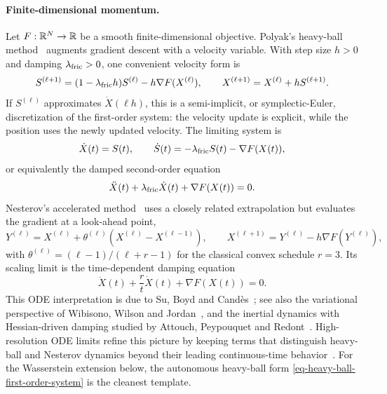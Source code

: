 \paragraph{Finite-dimensional momentum.}
Let $F:\mathbb{R}^{N}\to\mathbb{R}$ be a smooth finite-dimensional objective. Polyak's heavy-ball method~\cite{Polyak1964HeavyBall} augments gradient descent with a velocity variable. With step size $h>0$ and damping $\lambda_{\rm fric}>0$, one convenient velocity form is
\begin{equation}\label{eq-polyak-momentum}
	S^{(\ell+1)}=(1-\lambda_{\rm fric} h)S^{(\ell)}-h\nabla F(X^{(\ell)}),
	\qquad
	X^{(\ell+1)}=X^{(\ell)}+hS^{(\ell+1)}.
\end{equation}
If $S^{(\ell)}$ approximates $\dot X(\ell h)$, this is a semi-implicit, or symplectic-Euler, discretization of the first-order system: the velocity update is explicit, while the position uses the newly updated velocity. The limiting system is
\begin{equation}\label{eq-heavy-ball-first-order-system}
	\dot X(t)=S(t),
	\qquad
	\dot S(t)=-\lambda_{\rm fric} S(t)-\nabla F(X(t)),
\end{equation}
or equivalently the damped second-order equation
\begin{equation}\label{eq-heavy-ball-ode}
	\ddot X(t)+\lambda_{\rm fric}\dot X(t)+\nabla F(X(t))=0.
\end{equation}
Nesterov's accelerated method~\cite{Nesterov1983Accelerated} uses a closely related extrapolation but evaluates the gradient at a look-ahead point,
\begin{equation}\label{eq-nesterov-momentum}
	Y^{(\ell)}=X^{(\ell)}+\theta^{(\ell)}(X^{(\ell)}-X^{(\ell-1)}),
	\qquad
	X^{(\ell+1)}=Y^{(\ell)}-h\nabla F(Y^{(\ell)}),
\end{equation}
with $\theta^{(\ell)}=(\ell-1)/(\ell+r-1)$ for the classical convex schedule $r=3$. Its scaling limit is the time-dependent damping equation
\begin{equation}\label{eq-nesterov-ode}
	\ddot X(t)+\frac{r}{t}\dot X(t)+\nabla F(X(t))=0.
\end{equation}
This ODE interpretation is due to Su, Boyd and Cand{\`e}s~\cite{SuBoydCandes2016ODE}; see also the variational perspective of Wibisono, Wilson and Jordan~\cite{WibisonoWilsonJordan2016Acceleration}, and the inertial dynamics with Hessian-driven damping studied by Attouch, Peypouquet and Redont~\cite{AttouchPeypouquetRedont2016HessianDamping}. High-resolution ODE limits refine this picture by keeping terms that distinguish heavy-ball and Nesterov dynamics beyond their leading continuous-time behavior~\cite{ShiDuJordanSu2018HighResolution}. For the Wasserstein extension below, the autonomous heavy-ball form \eqref{eq-heavy-ball-first-order-system} is the cleanest template.

